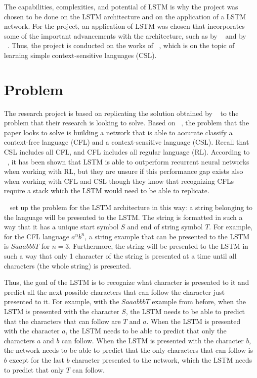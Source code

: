 \documentclass[11pt,letterpaper]{article}
\begin{document}
The capabilities, complexities, and potential of LSTM is why the project was chosen to be done on the LSTM architecture and on the application of a LSTM network. For the project, an application of LSTM was chosen that incorporates some of the important advancements with the architecture, such as by ~\cite{Gers:99} and by ~\cite{Gers:02}. Thus, the project is conducted on the works of ~\cite{Gers:01}, which is on the topic of learning simple context-sensitive languages (CSL).  

\section{Problem}
The research project is based on replicating the solution obtained by ~\cite{Gers:01} to the problem that their research is looking to solve. Based on ~\cite{Gers:01}, the problem that the paper looks to solve is building a network that is able to accurate classify a context-free language (CFL) and a context-sensitive language (CSL). Recall that CSL includes all CFL, and CFL includes all regular language (RL). According to ~\cite{Gers:01}, it has been shown that LSTM is able to outperform recurrent neural networks when working with RL, but they are unsure if this performance gap exists also when working with CFL and CSL though they know that recognizing CFLs require a stack which the LSTM would need to be able to replicate.

~\cite{Gers:01} set up the problem for the LSTM architecture in this way: a string belonging to the language will be presented to the LSTM. The string is formatted in such a way that it has a unique start symbol $S$ and end of string symbol $T$. For example, for the CFL language $a^nb^n$, a string example that can be presented to the LSTM is $SaaabbbT$ for $n = 3$. Furthermore, the string will be presented to the LSTM in such a way that only 1 character of the string is presented at a time until all characters (the whole string) is presented. 

Thus, the goal of the LSTM is to recognize what character is presented to it and predict all the next possible characters that can follow the character just presented to it. For example, with the $SaaabbbT$ example from before, when the LSTM is presented with the character $S$, the LSTM needs to be able to predict that the characters that can follow are $T$ and $a$. When the LSTM is presented with the character $a$, the LSTM needs to be able to predict that only the characters $a$ and $b$ can follow. When the LSTM is presented with the character $b$, the network needs to be able to predict that the only characters that can follow is $b$ except for the last $b$ character presented to the network, which the LSTM needs to predict that only $T$ can follow.
\end{document}
